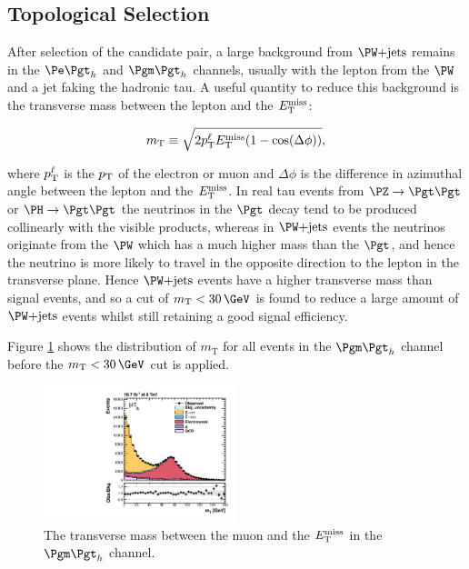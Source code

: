 \subsection{Topological Selection}
\label{sec:topologicalselection}

After selection of the candidate pair, a large background from $\WJets$ remains
in the $\etau$ and $\mutau$ channels, usually with the lepton from the $\PW$ and
a jet faking the hadronic tau. A useful quantity to reduce this background is
the transverse mass between the lepton and the $E_{\mathrm{T}}^{\text{miss}}$:

\begin{equation}
m_{\text{T}}\equiv\sqrt{2p_{\mathrm{T}}^{\ell}E_{\mathrm{T}}^{\text{miss}}(1-\cos(\Delta\phi))},
\end{equation}

where $p_{\mathrm{T}}^{\ell}$ is the $p_{\mathrm{T}}$ of the electron or muon and $\Delta\phi$ is the
difference in azimuthal angle between the lepton and the $E_{\mathrm{T}}^{\text{miss}}$. In real tau
events from $\PZ\to\Pgt\Pgt$ or $\PH\to\Pgt\Pgt$ the neutrinos in the $\Pgt$
decay tend to be produced collinearly with the visible products, whereas in
$\WJets$ events the neutrinos originate from the $\PW$ which has a much higher
mass than the $\Pgt$, and hence the neutrino is more likely to travel in the
opposite direction to the lepton in the transverse plane. Hence $\WJets$ events
have a higher transverse mass than signal events, and so a cut of
$m_{\text{T}}<30\,\GeV$ is found to reduce a large amount of $\WJets$ events
whilst still retaining a good signal efficiency.

Figure \ref{fig:transversemass} shows the distribution of $m_{\text{T}}$ for all
events in the $\mutau$ channel before the $m_{\text{T}}<30\,\GeV$ cut is
applied.

\begin{figure}[htb]
\begin{center}
    \includegraphics[width=0.5\textwidth]
      {plots/htt-sm/mt_1_inclusive_mt_2012.pdf}

\end{center}
\caption{
 The transverse mass between the muon and the $E_{\mathrm{T}}^{\text{miss}}$ in the $\mutau$ channel.  
}
\label{fig:transversemass}
\end{figure}


